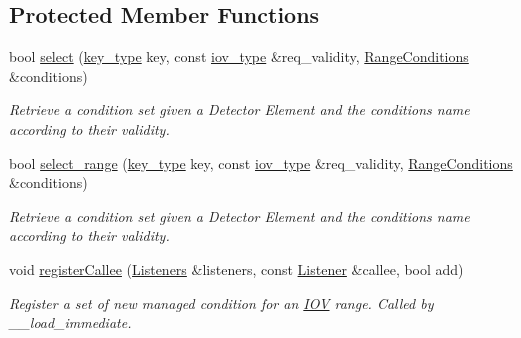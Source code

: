\subsection*{Protected Member Functions}
\begin{DoxyCompactItemize}
\item 
bool \hyperlink{class_d_d4hep_1_1_conditions_1_1_conditions_manager_object_aa859ab1f2f920ff8b69869d27e3dd8d1}{select} (\hyperlink{class_d_d4hep_1_1_conditions_1_1_conditions_manager_object_ac44eafc69174743e81d2f60e1f510719}{key\_\-type} key, const \hyperlink{class_d_d4hep_1_1_i_o_v}{iov\_\-type} \&req\_\-validity, \hyperlink{namespace_d_d4hep_1_1_conditions_ae765f0140a33973a430280f02b6062f4}{RangeConditions} \&conditions)
\begin{DoxyCompactList}\small\item\em Retrieve a condition set given a Detector Element and the conditions name according to their validity. \item\end{DoxyCompactList}\item 
bool \hyperlink{class_d_d4hep_1_1_conditions_1_1_conditions_manager_object_a64da19430050ca03c6ee43c83ca68dd9}{select\_\-range} (\hyperlink{class_d_d4hep_1_1_conditions_1_1_conditions_manager_object_ac44eafc69174743e81d2f60e1f510719}{key\_\-type} key, const \hyperlink{class_d_d4hep_1_1_i_o_v}{iov\_\-type} \&req\_\-validity, \hyperlink{namespace_d_d4hep_1_1_conditions_ae765f0140a33973a430280f02b6062f4}{RangeConditions} \&conditions)
\begin{DoxyCompactList}\small\item\em Retrieve a condition set given a Detector Element and the conditions name according to their validity. \item\end{DoxyCompactList}\item 
void \hyperlink{class_d_d4hep_1_1_conditions_1_1_conditions_manager_object_ac945da1c9e23ba4e7db40221a38d4abc}{registerCallee} (\hyperlink{class_d_d4hep_1_1_conditions_1_1_conditions_manager_object_aba0162524bc90a39e30bd5f1f0067ee2}{Listeners} \&listeners, const \hyperlink{class_d_d4hep_1_1_conditions_1_1_conditions_manager_object_ac4cd1e3a448bc1f8bae384d194f10c23}{Listener} \&callee, bool add)
\begin{DoxyCompactList}\small\item\em Register a set of new managed condition for an \hyperlink{class_d_d4hep_1_1_i_o_v}{IOV} range. Called by \_\-\_\-load\_\-immediate. \item\end{DoxyCompactList}\item 

\end{DoxyCompactItemize}
